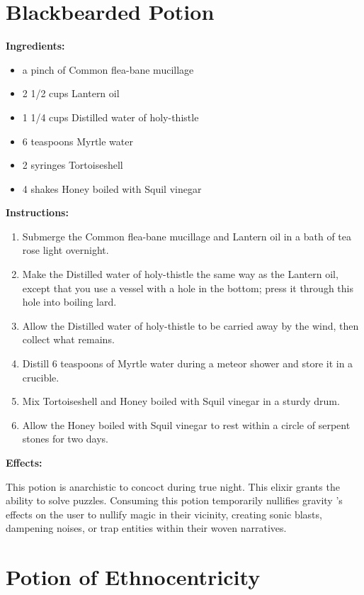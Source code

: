 \documentclass{article}
\begin{document}
\newpage
\section*{Blackbearded Potion}

\textbf{Ingredients:}

\begin{itemize}
  \item a pinch of Common flea-bane mucillage
  \item 2 1/2 cups Lantern oil
  \item 1 1/4 cups Distilled water of holy-thistle
  \item 6 teaspoons Myrtle water
  \item 2 syringes Tortoiseshell
  \item 4 shakes Honey boiled with  Squil vinegar
\end{itemize}

\textbf{Instructions:}

\begin{enumerate}
  \item Submerge the Common flea-bane mucillage and Lantern oil in a bath of tea rose light overnight.
  \item Make the Distilled water of holy-thistle the same way as the Lantern oil, except that you use a vessel with a hole in the bottom; press it through this hole into boiling lard.
  \item Allow the Distilled water of holy-thistle to be carried away by the wind, then collect what remains.
  \item Distill 6 teaspoons of Myrtle water during a meteor shower and store it in a crucible.
  \item Mix Tortoiseshell and Honey boiled with  Squil vinegar in a sturdy drum.
  \item Allow the Honey boiled with  Squil vinegar to rest within a circle of serpent stones for two days.
\end{enumerate}

\textbf{Effects:}

This potion is anarchistic to concoct during true night. This elixir grants the ability to solve puzzles. Consuming this potion temporarily nullifies gravity 's effects on the user to nullify magic in their vicinity, creating sonic blasts, dampening noises, or trap entities within their woven narratives.

\newpage
\section*{Potion of Ethnocentricity}
\end{document}
